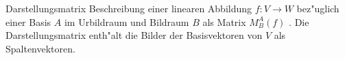 \documentclass[class=article, crop=false]{standalone}
\begin{document}
\begin{zettel}{Darstellungsmatrix}
    Beschreibung einer linearen Abbildung  $f: V \longrightarrow W$ bez"uglich einer Basis $A$ im Urbildraum und Bildraum $B$ als Matrix $M^{A}_{B} (f)$ .
    Die Darstellungsmatrix enth"alt die Bilder der Basisvektoren von $V$ als Spaltenvektoren.

\end{zettel}
\end{document}
